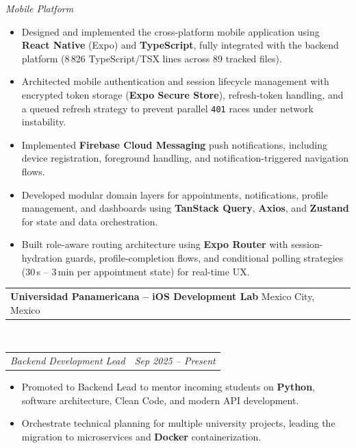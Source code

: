 \documentclass[11pt, letterpaper]{article}
\makeatletter
\newcommand{\entry}[2]{%
  \noindent
  \begin{tabular*}{\textwidth}{@{}l@{\extracolsep{\fill}}r@{}}
    #1 & #2
  \end{tabular*}%
}
\newcommand{\job}[4]{%
  \entry{\textbf{#1} \hspace{4pt} #2}{}%
  \\[1pt]%
  \entry{\textit{#3}}{\textit{#4}}%
}
\newenvironment{cvlist}{%
  \begin{itemize}[
    leftmargin=1.4em,
    itemsep=1.5pt,
    topsep=3pt,
    parsep=0pt
  ]
}{%
  \end{itemize}%
}
\makeatother
\begin{document}
\vspace{4pt}
\textit{Mobile Platform}

\begin{cvlist}
  \item Designed and implemented the cross-platform mobile application
        using \textbf{React Native} (Expo) and \textbf{TypeScript},
        fully integrated with the backend platform
        (8\,826 TypeScript/TSX lines across 89 tracked files).

  \item Architected mobile authentication and session lifecycle management
        with encrypted token storage (\textbf{Expo Secure Store}),
        refresh-token handling, and a queued refresh strategy to prevent
        parallel \texttt{401} races under network instability.

  \item Implemented \textbf{Firebase Cloud Messaging} push notifications,
        including device registration, foreground handling, and
        notification-triggered navigation flows.

  \item Developed modular domain layers for appointments, notifications,
        profile management, and dashboards using
        \textbf{TanStack Query}, \textbf{Axios}, and \textbf{Zustand}
        for state and data orchestration.

  \item Built role-aware routing architecture using \textbf{Expo Router}
        with session-hydration guards, profile-completion flows, and
        conditional polling strategies (30\,s -- 3\,min per appointment
        state) for real-time UX.
\end{cvlist}

\bigskip

\job{Universidad Panamericana -- iOS Development Lab}{Mexico City, Mexico}
    {Backend Development Lead}{Sep 2025 -- Present}

\begin{cvlist}
  \item Promoted to Backend Lead to mentor incoming students on
        \textbf{Python}, software architecture, Clean Code, and modern
        API development.
  \item Orchestrate technical planning for multiple university projects,
        leading the migration to microservices and \textbf{Docker}
        containerization.
\end{cvlist}
\end{document}

